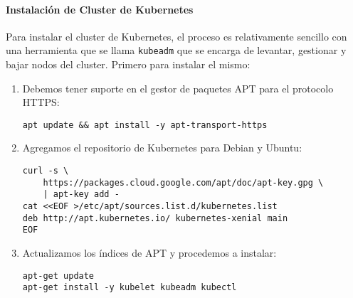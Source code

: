 \paragraph{Instalación de Cluster de Kubernetes}
Para instalar el cluster de Kubernetes, el proceso es relativamente sencillo con una herramienta que se llama \texttt{kubeadm} que se encarga de levantar, gestionar y bajar nodos del cluster. Primero para instalar el mismo:
\begin{enumerate}
	\item Debemos tener suporte en el gestor de paquetes APT para el protocolo HTTPS:
    \begin{lstlisting}
apt update && apt install -y apt-transport-https
    \end{lstlisting}	
	\item Agregamos el repositorio de Kubernetes para Debian y Ubuntu:
    \begin{lstlisting}
curl -s \
	https://packages.cloud.google.com/apt/doc/apt-key.gpg \
	| apt-key add -
cat <<EOF >/etc/apt/sources.list.d/kubernetes.list
deb http://apt.kubernetes.io/ kubernetes-xenial main
EOF
    \end{lstlisting}
    \item Actualizamos los índices de APT y procedemos a instalar:
    \begin{lstlisting}
apt-get update
apt-get install -y kubelet kubeadm kubectl
    \end{lstlisting}
\end{enumerate}

